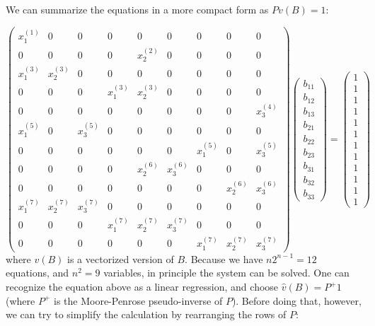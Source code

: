 \documentclass[]{book}
\begin{document}
We can summarize the equations in a more compact form as \(P v(B)=1\):

\[
\begin{pmatrix}
x_1^{(1)} & 0 & 0 & 0 & 0 & 0 & 0 & 0 & 0 \\
0 & 0 & 0 & 0 & x_2^{(2)} & 0 & 0 & 0 & 0 \\
x_1^{(3)} & x_2^{(3)} & 0 & 0 & 0 & 0 & 0 & 0 & 0 \\
0 & 0 & 0 & x_1^{(3)} & x_2^{(3)} & 0 & 0 & 0 & 0 \\
0 & 0 & 0 & 0 & 0 & 0 & 0 & 0 & x_3^{(4)} \\
x_1^{(5)} & 0 & x_3^{(5)} & 0 & 0 & 0 & 0 & 0 & 0 \\
0 & 0 & 0 & 0 & 0 & 0 & x_1^{(5)} & 0 & x_3^{(5)} \\
0 & 0 & 0 & 0 & x_2^{(6)} & x_3^{(6)} & 0 & 0 & 0 \\
0 & 0 & 0 & 0 & 0 & 0 & 0 & x_2^{(6)} & x_3^{(6)}\\
x_1^{(7)} & x_2^{(7)} & x_3^{(7)} & 0 & 0 & 0 & 0 & 0 & 0 \\
0 & 0 & 0 & x_1^{(7)} & x_2^{(7)} & x_3^{(7)} & 0 & 0 & 0 \\
0 & 0 & 0 & 0 & 0 & 0 & x_1^{(7)} & x_2^{(7)} & x_3^{(7)} 
\end{pmatrix}
\begin{pmatrix}
b_{11}\\
b_{12}\\
b_{13}\\
b_{21}\\
b_{22}\\
b_{23}\\
b_{31}\\
b_{32}\\
b_{33}
\end{pmatrix} 
= 
\begin{pmatrix}
1\\
1\\
1\\
1\\
1\\
1\\
1\\
1\\
1\\
1\\
1\\
1
\end{pmatrix}
\]
where \(v(B)\) is a vectorized version of \(B\). Because we have \(n 2^{n-1} = 12\) equations, and \(n^2 = 9\) variables, in principle the system can be solved. One can recognize the equation above as a linear regression, and choose \(\hat{v}(B) = P^{+}1\) (where \(P^{+}\) is the Moore-Penrose pseudo-inverse of \(P\)). Before doing that, however, we can try to simplify the calculation by rearranging the rows of \(P\):
\end{document}

